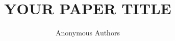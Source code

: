 \documentclass{article}
\title{YOUR PAPER TITLE}
\author{%
  Anonymous Authors
}
\begin{document}
\maketitle

\begin{abstract}

\end{abstract}











\appendix

\end{document}

